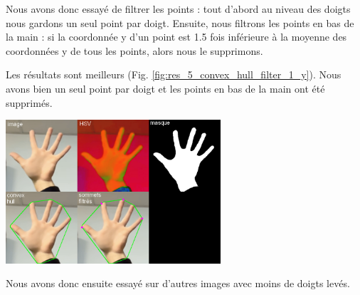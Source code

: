 \documentclass[11pt]{article}
\begin{document}
Nous avons donc essayé de filtrer les points : tout d'abord au niveau des doigts nous gardons un seul point par doigt. Ensuite, nous filtrons les points en bas de la main : si la coordonnée y d'un point est 1.5 fois inférieure à la moyenne des coordonnées y de tous les points, alors nous le supprimons.\bigbreak

Les résultats sont meilleurs (Fig. \ref{fig:res_5_convex_hull_filter_1_y}). Nous avons bien un seul point par doigt et les points en bas de la main ont été supprimés. 
\begin{center}
    \includegraphics[width=0.6\textwidth]{images/res_5_convex_hull_filter_1_y.png}
    \label{fig:res_5_convex_hull_filter_1_y}
\end{center}
\bigbreak

Nous avons donc ensuite essayé sur d'autres images avec moins de doigts levés. \bigbreak
\end{document}
